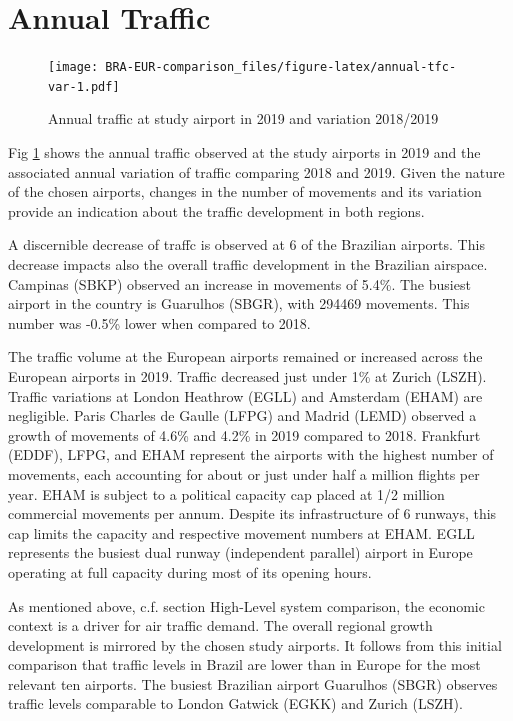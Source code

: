 \documentclass[
]{book}
\begin{document}
\hypertarget{annualtraffic}{%
\section{Annual Traffic}\label{annualtraffic}}



\begin{figure}
\centering
\texttt{[image: BRA-EUR-comparison\_files/figure-latex/annual-tfc-var-1.pdf]}
\caption{\label{fig:annual-tfc-var}Annual traffic at study airport in 2019 and variation 2018/2019}
\end{figure}

Fig \ref{fig:annual-tfc-var} shows the annual traffic observed at the study airports in 2019 and the associated annual variation of traffic comparing 2018 and 2019.
Given the nature of the chosen airports, changes in the number of movements and its variation provide an indication about the traffic development in both regions.

A discernible decrease of traffc is observed at 6 of the Brazilian airports.
This decrease impacts also the overall traffic development in the Brazilian airspace.
Campinas (SBKP) observed an increase in movements of 5.4\%.
The busiest airport in the country is Guarulhos (SBGR), with 294469 movements. This number was -0.5\% lower when compared to 2018.

The traffic volume at the European airports remained or increased across the European airports in 2019.
Traffic decreased just under 1\% at Zurich (LSZH). Traffic variations at London Heathrow (EGLL) and Amsterdam (EHAM) are negligible.
Paris Charles de Gaulle (LFPG) and Madrid (LEMD) observed a growth of movements of 4.6\% and 4.2\% in 2019 compared to 2018.
Frankfurt (EDDF), LFPG, and EHAM represent the airports with the highest number of movements, each accounting for about or just under half a million flights per year.
EHAM is subject to a political capacity cap placed at 1/2 million commercial movements per annum.
Despite its infrastructure of 6 runways, this cap limits the capacity and respective movement numbers at EHAM.
EGLL represents the busiest dual runway (independent parallel) airport in Europe operating at full capacity during most of its opening hours.

As mentioned above, c.f. section High-Level system comparison, the economic context is a driver for air traffic demand.
The overall regional growth development is mirrored by the chosen study airports.
It follows from this initial comparison that traffic levels in Brazil are lower than in Europe for the most relevant ten airports.
The busiest Brazilian airport Guarulhos (SBGR) observes traffic levels comparable to London Gatwick (EGKK) and Zurich (LSZH).
\end{document}
